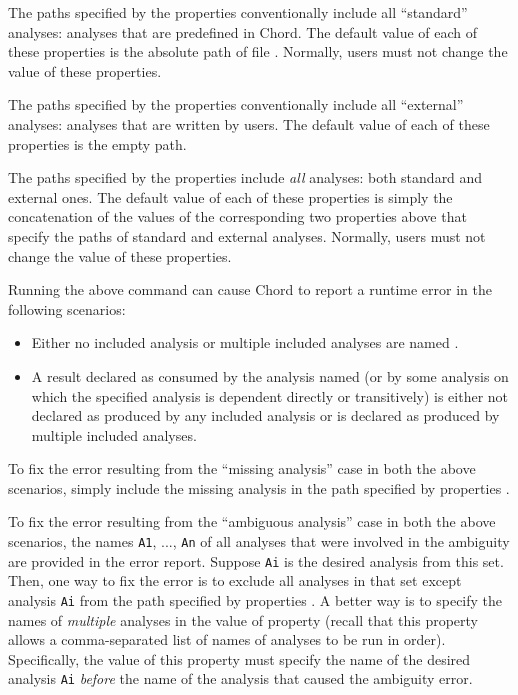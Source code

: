 The paths specified by the  properties
conventionally include all ``standard'' analyses: analyses that are predefined
in Chord.  The default value of each of these properties is the absolute path of
file .  Normally, users must not change the value of these
properties.

The paths specified by the  properties
conventionally include all ``external'' analyses: analyses that are written by
users.  The default value of each of these properties is the empty path.

The paths specified by the  properties include {\it
all} analyses: both standard and external ones.  The default value of each of
these properties is simply the concatenation of the values of the corresponding
two properties above that specify the paths of standard and external analyses.
Normally, users must not change the value of these properties.

Running the above command can cause Chord to report a runtime error in the following scenarios:

\begin{itemize}
\item
Either no included analysis or multiple included analyses are named .
\item
A result declared as consumed by the analysis named  (or by some
analysis on which the specified analysis is dependent directly or transitively) is either not 
declared as produced by any included analysis or is declared as produced by multiple included analyses.
\end{itemize}

To fix the error resulting from the ``missing analysis'' case in both the above scenarios,
simply include the missing analysis in the path specified by properties .

To fix the error resulting from the ``ambiguous analysis'' case in both the above scenarios,
the names {\tt A1}, ..., {\tt An} of all analyses that were involved in the ambiguity are
provided in the error report.  Suppose {\tt Ai} is the desired analysis from this set.
Then, one way to fix the error is to exclude all analyses in that set except analysis {\tt Ai}
from the path specified by properties .
A better way is to specify the names of {\it multiple} analyses in the value of property
 (recall that this property
allows a comma-separated list of names of analyses to be run in order).
Specifically, the value of this property must specify the name of the desired analysis {\tt Ai} 
{\it before} the name of the analysis that caused the ambiguity error.

